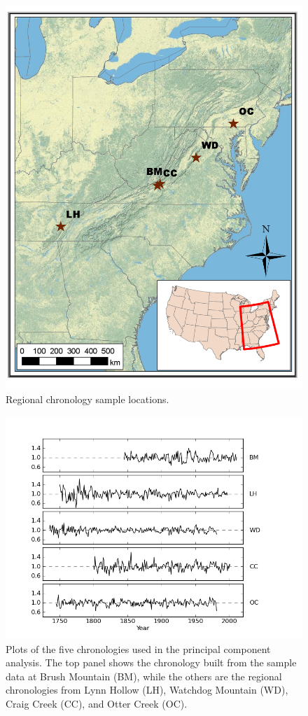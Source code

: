 \begin{figure}
\centering
\includegraphics[width=5in]{figures/NewClimateNADEF.png}
\caption{Regional chronology sample locations.}
\label{fig:map}
\end{figure}

\begin{figure}
\centering
\includegraphics[width=5in]{figures/stacked_chrons.png}
\caption{Plots of the five chronologies used in the principal component analysis. The top panel shows the chronology built from the sample data at Brush Mountain (BM), while the others are the regional chronologies from Lynn Hollow (LH), Watchdog Mountain (WD), Craig Creek (CC), and Otter Creek (OC).}
\label{fig:stackedChrons}
\end{figure}

